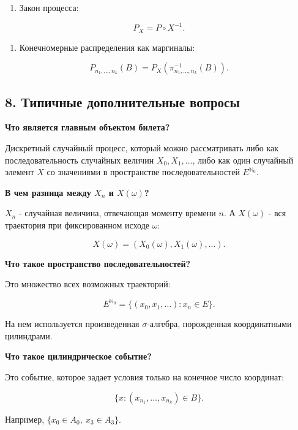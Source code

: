 \documentclass[
  11pt,
  a4paper,
]{article}
\providecommand{\tightlist}{%
  \setlength{\itemsep}{0pt}\setlength{\parskip}{0pt}}
\begin{document}
\begin{enumerate}
\def\labelenumi{\arabic{enumi}.}
\setcounter{enumi}{5}
\tightlist
\item
  Закон процесса:
\end{enumerate}

\[
P_X=P\circ X^{-1}.
\]

\begin{enumerate}
\def\labelenumi{\arabic{enumi}.}
\setcounter{enumi}{6}
\tightlist
\item
  Конечномерные распределения как маргиналы:
\end{enumerate}

\[
P_{n_1,\ldots,n_k}(B)
=
P_X(\pi_{n_1,\ldots,n_k}^{-1}(B)).
\]

\subsection{8. Типичные дополнительные
вопросы}\label{ux442ux438ux43fux438ux447ux43dux44bux435-ux434ux43eux43fux43eux43bux43dux438ux442ux435ux43bux44cux43dux44bux435-ux432ux43eux43fux440ux43eux441ux44b}

\textbf{Что является главным объектом билета?}

Дискретный случайный процесс, который можно рассматривать либо как
последовательность случайных величин \(X_0,X_1,\ldots\), либо как один
случайный элемент \(X\) со значениями в пространстве последовательностей
\(E^{\mathbb N_0}\).

\textbf{В чем разница между \(X_n\) и \(X(\omega)\)?}

\(X_n\) - случайная величина, отвечающая моменту времени \(n\). А
\(X(\omega)\) - вся траектория при фиксированном исходе \(\omega\):

\[
X(\omega)=(X_0(\omega),X_1(\omega),\ldots).
\]

\textbf{Что такое пространство последовательностей?}

Это множество всех возможных траекторий:

\[
E^{\mathbb N_0}=\{(x_0,x_1,\ldots):x_n\in E\}.
\]

На нем используется произведенная \(\sigma\)-алгебра, порожденная
координатными цилиндрами.

\textbf{Что такое цилиндрическое событие?}

Это событие, которое задает условия только на конечное число координат:

\[
\{x:(x_{n_1},\ldots,x_{n_k})\in B\}.
\]

Например, \(\{x_0\in A_0,\ x_3\in A_3\}\).
\end{document}
